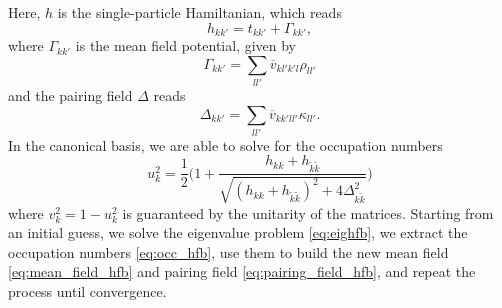 Here, $h$ is the single-particle Hamiltanian, which reads
\begin{equation}
    h_{kk'} = t_{kk'} +\Gamma_{kk'},
\end{equation}
where $\Gamma_{kk'}$ is the mean field potential, given by
\begin{equation}
    \label{eq:mean_field_hfb}
    \Gamma_{kk'} = \sum_{ll'}\overline{v}_{kl'k'l}\rho_{ll'}
    \end{equation}
and the pairing field $\Delta$ reads
\begin{equation}
    \label{eq:pairing_field_hfb}
    \Delta_{kk'} = \sum_{ll'}\overline{v}_{kk'll'}\kappa_{ll'}.
\end{equation}
In the canonical basis, we are able to solve for the occupation numbers
\begin{equation}
    \label{eq:occ_hfb}
    u_k^2 = \frac 1 2 \bigg(1+\frac{h_{kk}+h_{\tilde k \tilde k}}{\sqrt{(h_{kk}+h_{\tilde k \tilde k})^2+4\Delta_{k\tilde k}^2}}\bigg)
\end{equation}
where $v_k^2 = 1 - u_k^2$ is guaranteed by the unitarity of the matrices.
Starting from an initial guess, we solve the eigenvalue problem \eqref{eq:eighfb}, we extract the occupation numbers \eqref{eq:occ_hfb}, use them to build the new mean field \eqref{eq:mean_field_hfb} and pairing field \eqref{eq:pairing_field_hfb}, and repeat the process until convergence.
